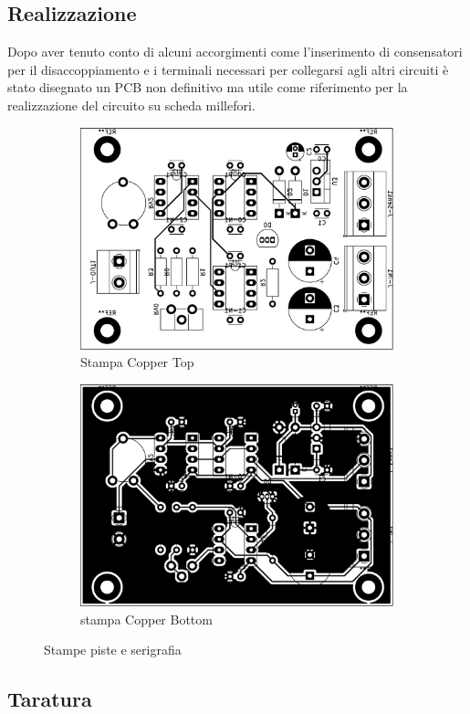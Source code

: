 \subsection{Realizzazione}
Dopo aver tenuto conto di alcuni accorgimenti come l'inserimento di consensatori
per il disaccoppiamento e i terminali necessari per collegarsi agli altri
circuiti è stato disegnato un PCB non definitivo ma utile come riferimento per
la realizzazione del circuito su scheda millefori.

\begin{figure}[H]
    \centering
    \begin{subfigure}{0.49\textwidth}
        \centering
        \includegraphics[scale=0.25]{corrente/top.pdf}
        \caption{Stampa Copper Top}
    \end{subfigure}
    \begin{subfigure}{0.49\textwidth}
        \centering
        \includegraphics[scale=0.25]{corrente/bottom.pdf}
        \caption{stampa Copper Bottom}
    \end{subfigure}
    \caption{Stampe piste e serigrafia}
\end{figure}


\subsection{Taratura}